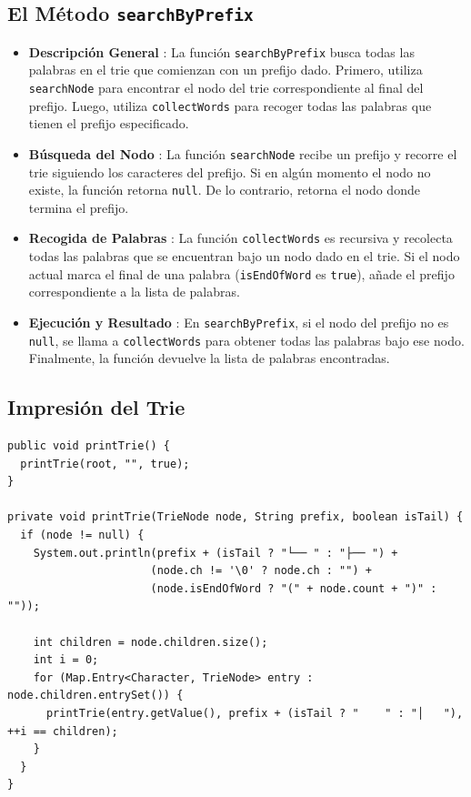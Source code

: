 \documentclass[11pt, a4paper]{article}
\begin{document}
\subsection{El Método \texttt{searchByPrefix}}
\begin{itemize}
  \item \textbf{Descripción General} : La función \texttt{searchByPrefix} busca todas las palabras en el trie que comienzan con un prefijo dado. Primero, utiliza \texttt{searchNode} para encontrar el nodo del trie correspondiente al final del prefijo. Luego, utiliza \texttt{collectWords} para recoger todas las palabras que tienen el prefijo especificado.
  \item \textbf{Búsqueda del Nodo} : La función \texttt{searchNode} recibe un prefijo y recorre el trie siguiendo los caracteres del prefijo. Si en algún momento el nodo no existe, la función retorna \texttt{null}. De lo contrario, retorna el nodo donde termina el prefijo.
  \item \textbf{Recogida de Palabras} : La función \texttt{collectWords} es recursiva y recolecta todas las palabras que se encuentran bajo un nodo dado en el trie. Si el nodo actual marca el final de una palabra (\texttt{isEndOfWord} es \texttt{true}), añade el prefijo correspondiente a la lista de palabras.
  \item \textbf{Ejecución y Resultado} : En \texttt{searchByPrefix}, si el nodo del prefijo no es \texttt{null}, se llama a \texttt{collectWords} para obtener todas las palabras bajo ese nodo. Finalmente, la función devuelve la lista de palabras encontradas.
\end{itemize}

\subsection{Impresión del Trie}

\begin{verbatim}
public void printTrie() {
  printTrie(root, "", true);
}

private void printTrie(TrieNode node, String prefix, boolean isTail) {
  if (node != null) {
    System.out.println(prefix + (isTail ? "└── " : "├── ") +
                      (node.ch != '\0' ? node.ch : "") +
                      (node.isEndOfWord ? "(" + node.count + ")" : ""));

    int children = node.children.size();
    int i = 0;
    for (Map.Entry<Character, TrieNode> entry : node.children.entrySet()) {
      printTrie(entry.getValue(), prefix + (isTail ? "    " : "│   "), ++i == children);
    }
  }
}

\end{verbatim}
\end{document}
